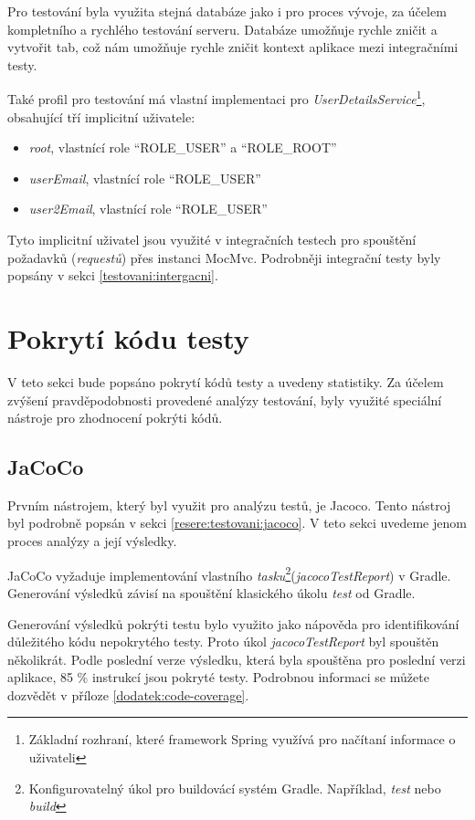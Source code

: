     Pro testování byla  využita stejná databáze jako i pro proces vývoje, za účelem kompletního a rychlého testování serveru. Databáze umožňuje rychle zničit a vytvořit tab, což nám umožňuje rychle zničit kontext aplikace mezi integračními testy.
    
    Také profil pro testování má vlastní implementaci pro \textit{UserDetailsService}\footnote{Základní rozhraní, které framework Spring využívá pro načítaní informace o uživateli}, obsahující tří implicitní uživatele:
    \begin{itemize}
            \item \textit{root}, vlastnící role \enquote{ROLE\_USER} a \enquote{ROLE\_ROOT} 
            \item \textit{userEmail}, vlastnící role \enquote{ROLE\_USER}
            \item \textit{user2Email}, vlastnící role \enquote{ROLE\_USER}
    \end{itemize}
    Tyto implicitní uživatel jsou využité v integračních testech pro spouštění požadavků (\textit{requestů}) přes instanci MocMvc. Podrobněji integrační testy byly popsány v sekci \ref{testovani:intergacni}.
    
\section{Pokrytí kódu testy}\label{testovani:pokryti}
    V teto sekci bude popsáno pokrytí kódů testy a uvedeny statistiky. Za účelem zvýšení pravděpodobnosti provedené analýzy testování, byly využité speciální nástroje pro zhodnocení pokrýti kódů.
    \subsection{JaCoCo}
    Prvním nástrojem, který byl využit pro analýzu testů, je Jacoco. Tento nástroj byl podrobně popsán v sekci \ref{resere:testovani:jacoco}. V teto sekci uvedeme jenom proces analýzy a její výsledky.
    
    JaCoCo vyžaduje implementování vlastního \textit{tasku}\footnote{Konfigurovatelný úkol pro buildovácí systém Gradle. Například, \textit{test} nebo \textit{build}}(\textit{jacocoTestReport}) v Gradle. Generování výsledků závisí na spouštění klasického úkolu \textit{test} od Gradle. 
    
    Generování výsledků pokrýti testu bylo využito jako nápověda pro identifikování důležitého kódu nepokrytého testy. Proto úkol \textit{jacocoTestReport} byl spouštěn několikrát. Podle poslední verze výsledku, která byla spouštěna pro poslední verzi aplikace, 85 \% instrukcí jsou pokryté testy. Podrobnou informaci se můžete dozvědět v příloze \ref{dodatek:code-coverage}.
